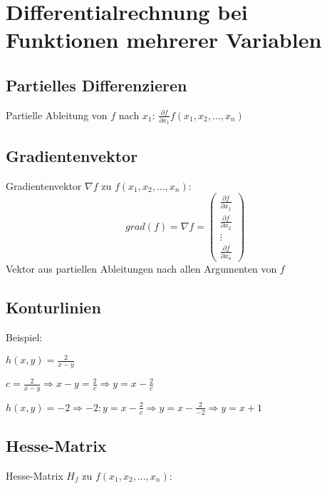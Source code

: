 \section{Differentialrechnung bei Funktionen mehrerer Variablen} %
\label{sec:differentialrechnung_bei_funktionen_mehrerer_variablen}

\subsection{Partielles Differenzieren} %
\label{sub:partielles_differenzieren}

Partielle Ableitung von $f$ nach $x_1$: $\frac{\partial f}{\partial x_1} f(x_1,x_2,...,x_n)$

\subsection{Gradientenvektor} %
\label{sub:gradientenvektor}
Gradientenvektor $\nabla f$ zu $f(x_1,x_2,...,x_n)$: 
\begin{equation}
	grad(f) = \nabla f = \left(\begin{array}{c} \frac{\partial f}{\partial x_1} \\ 
	\frac{\partial f}{\partial x_2} \\ \vdots \\ \frac{\partial f}{\partial x_n} \end{array}\right)
\end{equation}
Vektor aus partiellen Ableitungen nach allen Argumenten von $f$

\subsection{Konturlinien} %
\label{sub:konturlinien}
Beispiel:

$h(x,y)=\frac{2}{x-y}$

$c=\frac{2}{x-y} \Rightarrow x-y=\frac{2}{c} \Rightarrow y=x-\frac{2}{c}$

$h(x,y)=-2 \Rightarrow -2:y=x-\frac{2}{c} \Rightarrow y=x-\frac{2}{-2} \Rightarrow y=x+1$

\subsection{Hesse-Matrix} %
\label{sub:hesse_matrix}
Hesse-Matrix $H_f$ zu $f(x_1,x_2,...,x_n)$: 

